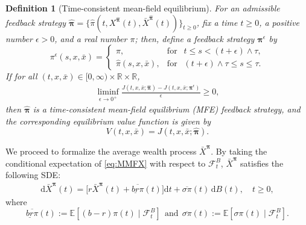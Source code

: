 \documentclass[11pt]{article}
\newtheorem{definition}{Definition}[section]
\newtheorem{remark}{Remark}[section]
\newcommand \drm {\mathrm{d}}
\newcommand \eps {\epsilon}
\newenvironment{bluepar}
{\begingroup\color{blue}}
{\endgroup}
\numberwithin{equation}{section}
\newcommand{\bpi}{\boldsymbol{\pi}}
\begin{document}
\begin{definition}[Time-consistent mean-field equilibrium]\label{def:StrongMFE}
For an admissible feedback strategy \(\widehat{\bm{\pi}}=\{\widehat{\pi}(t,X^{\widehat{\bpi}}(t),\bar{X}^{\widehat{\bpi}}(t))\}_{t\geq 0}\), fix a time $t\ge0$, a positive number \(\epsilon > 0\), and a real number $\pi$; then, define a feedback strategy $\bpi^{\eps}$ by
			\[
			\pi^{\eps}(s, x, \bar{x}) =
			\begin{cases}
				\pi, & \text{for } ~~   {t \leq s < (t+\epsilon) \wedge \tau,} \\
				\widehat{\pi}(s, x, \bar{x}), & \text{for }~~ (t+\epsilon) \wedge \tau \leq s \leq \tau.
			\end{cases}
			\]		
			If for all \((t, x, \bar{x}) \in [0,\infty) \times \mathbb{R} \times \mathbb{R}\),
			\begin{align}
				\liminf_{\epsilon \to 0^+} \frac{J(t, x, \bar{x}; \widehat{\bm{\pi}}) - J(t, x, \bar{x}; {\bm{\pi}^{\eps}})}{\epsilon} \geq 0,
			\end{align}
			then $\widehat{\bpi}$ is a time-consistent mean-field equilibrium (MFE) feedback strategy,
			and  the corresponding equilibrium value function is given by
			\[
			V(t, x, \bar{x}) = J(t, x, \bar{x}; \widehat{\bm{\pi}}).
			\]
	
		\end{definition}

\begin{bluepar}	
We proceed to formalize the average wealth process  $\bar{X}^{\bm{\pi}}$. By taking the conditional expectation of \eqref{eq:MMFX} with respect to $\mathcal{F}_t^B$, $\bar{X}^{\bm{\pi}}$ satisfies the following SDE:
	\begin{align}\label{eq:MMFbarX}
		\drm \bar{X}^{\bpi}(t)
		= \bigl[r\bar{X}^{\bpi}(t) + \overline{\underline{br}\pi}(t)\bigr]\drm t
		+ \overline{\sigma\pi}(t)\,\drm B(t), \quad t \geq 0,
	\end{align}
	where
\[
\overline{\underline{br}\pi}(t) := \mathbb{E}[(b-r)\pi(t)\mid\mathcal{F}_t^B]~~\mbox{and}~~\overline{\sigma\pi}(t) := \mathbb{E}[\sigma\pi(t)\mid\mathcal{F}_t^B].
\]
\end{bluepar}
\end{document}
